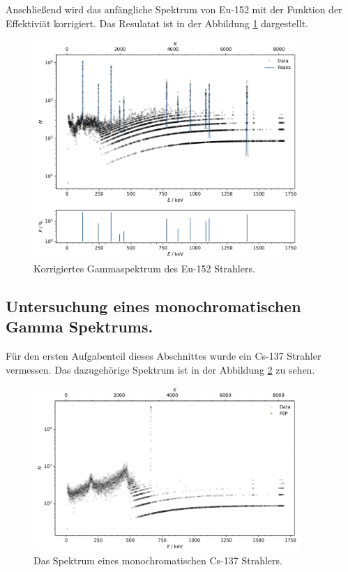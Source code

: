 Anschließend wird das anfängliche Spektrum von Eu-152 mit der Funktion der Effektiviät korrigiert.
Das Resulatat ist in der Abbildung \ref{fig:plot6} dargestellt.

\begin{figure}[H]
    \centering
    \includegraphics[width=0.9\textwidth]{content/plots/plot6.jpg}
   \caption{Korrigiertes Gammaspektrum des Eu-152 Strahlers.}
    \label{fig:plot6}
\end{figure}

\subsection{Untersuchung eines monochromatischen Gamma Spektrums.}
\label{sec:untersuchung gamma spektrum}

Für den ersten Aufgabenteil dieses Abschnittes wurde ein Cs-137 Strahler vermessen.
Das dazugehörige Spektrum ist in der Abbildung \ref{fig:plot7} zu sehen.

\begin{figure}[H]
    \centering
    \includegraphics[width=0.9\textwidth]{content/plots/plot7.jpg}
    \caption{Das Spektrum eines monochromatischen Cs-137 Strahlers.}
    \label{fig:plot7}
\end{figure}

